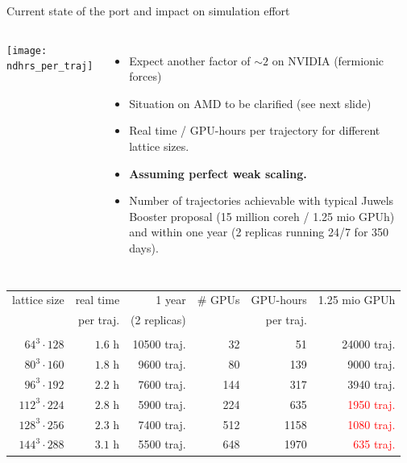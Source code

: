 \documentclass[xcolor={dvipsnames,table}]{beamer}
\begin{document}
\begin{frame}[fragile]{Current state of the port and impact on simulation effort}
  \begin{columns}
      \centering
      \texttt{[image: ndhrs\_per\_traj]}
      \begin{itemize}
        \item Expect another factor of $\sim 2$ on NVIDIA (fermionic forces)
        \vspace{0.2cm}
        \item Situation on AMD to be clarified (see next slide)
        \vspace{0.2cm}
        \item Real time / GPU-hours per trajectory for different lattice sizes.
        \vspace{0.2cm}
        \item \textbf{Assuming perfect weak scaling.}
        \vspace{0.2cm}
      \item Number of trajectories achievable with typical Juwels Booster proposal (15 million coreh / 1.25 mio GPUh) and within one year (2 replicas running 24/7 for 350 days).
      \end{itemize}
  \end{columns}
  \vspace{0.3cm}
  \begin{minipage}{\textwidth}
    \centering
    \begin{tabular}{rrrrrr}
      lattice size     & real time  & 1 year              & \# GPUs & GPU-hours & 1.25 mio GPUh \\
                       & per traj.  & (2 replicas)        &         & per traj. &               \\
      \hline \\                                           
      $64^3\cdot128$   &  $1.6$ h   & 10500 traj.         &  32     &   51      & 24000 traj.   \\
      $80^3\cdot160$   &  $1.8$ h   & 9600 traj.          &  80     &  139      &  9000 traj.   \\
      $96^3\cdot192$   &  $2.2$ h   & 7600 traj.          & 144     &  317      &  3940 traj.   \\
      $112^3\cdot224$  &  $2.8$ h   & 5900 traj.          & 224     &  635      &  \textcolor{red}{1950 traj.}   \\    
      $128^3\cdot256$  &  $2.3$ h   & 7400 traj.          & 512     & 1158      &  \textcolor{red}{1080 traj.}   \\
      $144^3\cdot288$  &  $3.1$ h   & 5500 traj.          & 648     & 1970      &  \textcolor{red}{635 traj.}
    \end{tabular}
  \end{minipage}
\end{frame}
\end{document}
